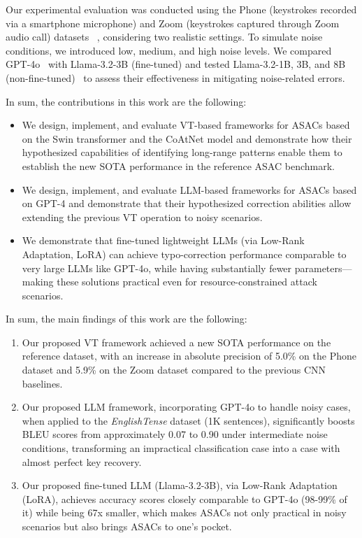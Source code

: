 Our experimental evaluation was conducted using the Phone (keystrokes recorded via a smartphone microphone) and Zoom (keystrokes captured through Zoom audio call) datasets ~\cite{harrison2023practical}, considering two realistic settings. To simulate noise conditions, we introduced low, medium, and high noise levels. We compared GPT-4o~\cite{hurst2024gpt} with Llama-3.2-3B (fine-tuned) and tested Llama-3.2-1B, 3B, and 8B (non-fine-tuned)~\cite{touvron2023llama} to assess their effectiveness in mitigating noise-related errors. 

In sum, the contributions in this work are the following:

\begin{itemize}
    \item We design, implement, and evaluate VT-based frameworks for ASACs based on the Swin transformer and the CoAtNet model and demonstrate how their hypothesized capabilities of identifying long-range patterns enable them to establish the new SOTA performance in the reference ASAC benchmark.
    \item We design, implement, and evaluate LLM-based frameworks for ASACs based on GPT-4 and demonstrate that their hypothesized correction abilities allow extending the previous VT operation to noisy scenarios.
    \item We demonstrate that fine-tuned lightweight LLMs (via Low-Rank Adaptation, LoRA) can achieve typo-correction performance comparable to very large LLMs like GPT-4o, while having substantially fewer parameters—making these solutions practical even for resource-constrained attack scenarios.
\end{itemize}

In sum, the main findings of this work are the following:

\begin{enumerate}
   \item Our proposed VT framework achieved a new SOTA performance on the reference dataset, with an increase in absolute precision of 5.0\% on the Phone dataset and 5.9\% on the Zoom dataset compared to the previous CNN baselines.
   \item Our proposed LLM framework, incorporating GPT-4o to handle noisy cases, when applied to the \textit{EnglishTense} dataset (1K sentences), significantly boosts BLEU scores from approximately 0.07 to 0.90 under intermediate noise conditions, transforming an impractical classification case into a case with almost perfect key recovery.
   \item Our proposed fine-tuned LLM (Llama-3.2-3B), via Low-Rank Adaptation (LoRA), achieves accuracy scores closely comparable to GPT-4o (98-99\% of it) while being 67x smaller, which makes ASACs not only practical in noisy scenarios but also brings ASACs to one's pocket.
\end{enumerate}

